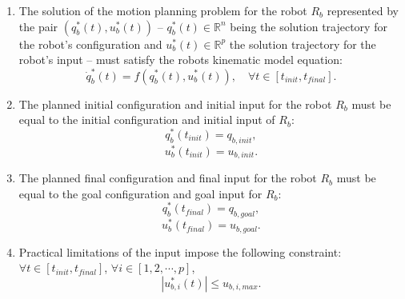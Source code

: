 \begin{enumerate}

    \item The solution of the motion planning problem
    for the robot $R_b$ represented by the pair
    $(q^{*}_b(t), u^{*}_b(t))$ --
    $q^{*}_b(t) \in \mathbb{R}^n$ being the solution trajectory for
    the robot's configuration and $u^{*}_b(t) \in \mathbb{R}^p$ the solution
    trajectory for the robot's input -- must satisfy the
    robots kinematic model equation:
    \begin{equation}\label{eq:kinematic}
        \dot{q}^{*}_b(t) = f(q^{*}_b(t),u^{*}_b(t)),\quad \forall t \in [t_{init}, t_{final}].
    \end{equation}
    
    \item The planned initial configuration and initial 
    input for the robot $R_b$ must
    be equal to the initial configuration and initial
    input of $R_b$:
    \begin{equation}
        q^{*}_{b}(t_{init}) = q_{b,init},
    \end{equation}
    \begin{equation}
        u^{*}_{b}(t_{init}) = u_{b,init}.
    \end{equation}

    \item The planned final configuration and final 
    input for the robot $R_b$ must
    be equal to the goal configuration and goal
    input for $R_b$:
    \begin{equation}\label{eq:finalconfig}
        q^{*}_{b}(t_{final}) = q_{b,goal},
    \end{equation}
    \begin{equation}\label{eq:finalinput}
        u^{*}_{b}(t_{final}) = u_{b,goal}.
    \end{equation}

    \item Practical limitations of the input impose
    the following constraint: $\forall t \in [t_{init}, t_{final}]$, $\forall i \in [1,2,\cdots, p]$,
    \begin{equation}
        |u^{*}_{b,i}(t)| \leq u_{b,i,max}.
    \end{equation}
    

\end{enumerate}
